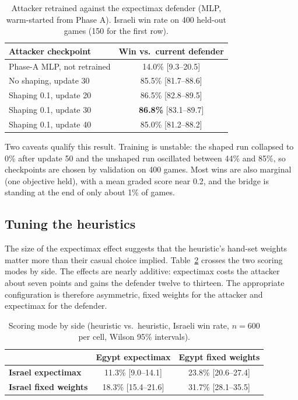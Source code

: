 \documentclass{article}
\begin{document}
\begin{table}[t]
\centering
\caption{Attacker retrained against the expectimax defender (MLP, warm-started from Phase
A). Israeli win rate on 400 held-out games (150 for the first row).}
\label{tab:retrain}
\begin{tabular}{lc}
\toprule
\textbf{Attacker checkpoint} & \textbf{Win vs.\ current defender} \\
\midrule
Phase-A MLP, not retrained           & 14.0\% [9.3--20.5] \\
No shaping, update 30                & 85.5\% [81.7--88.6] \\
Shaping 0.1, update 20               & 86.5\% [82.8--89.5] \\
Shaping 0.1, update 30               & \textbf{86.8\%} [83.1--89.7] \\
Shaping 0.1, update 40               & 85.0\% [81.2--88.2] \\
\bottomrule
\end{tabular}
\end{table}

Two caveats qualify this result. Training is unstable: the shaped run collapsed to 0\%
after update 50 and the unshaped run oscillated between 44\% and 85\%, so checkpoints are
chosen by validation on 400 games. Most wins are also marginal (one objective held), with
a mean graded score near 0.2, and the bridge is standing at the end of only about 1\% of
games.

\subsection{Tuning the heuristics}
\label{sec:tune}
The size of the expectimax effect suggests that the heuristic's hand-set weights matter
more than their casual choice implied. Table~\ref{tab:expside} crosses the
two scoring modes by side. The effects are nearly additive: expectimax costs the attacker
about seven points and gains the defender twelve to thirteen. The appropriate
configuration is therefore asymmetric, fixed weights for the attacker and expectimax for
the defender.

\begin{table}[t]
\centering
\caption{Scoring mode by side (heuristic vs.\ heuristic, Israeli win rate, $n=600$ per
cell, Wilson 95\% intervals).}
\label{tab:expside}
\begin{tabular}{lcc}
\toprule
 & \textbf{Egypt expectimax} & \textbf{Egypt fixed weights} \\
\midrule
\textbf{Israel expectimax}    & 11.3\% [9.0--14.1]  & 23.8\% [20.6--27.4] \\
\textbf{Israel fixed weights} & 18.3\% [15.4--21.6] & 31.7\% [28.1--35.5] \\
\bottomrule
\end{tabular}
\end{table}
\end{document}
